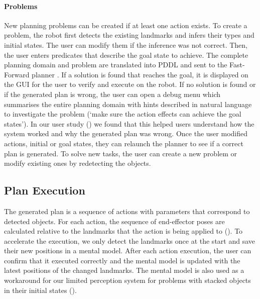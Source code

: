 \paragraph{Problems} New planning problems can be created if at least one action exists.
To create a problem, the robot first detects the existing landmarks and infers their types and initial states.
The user can modify them if the inference was not correct.
Then, the user enters predicates that describe the goal state to achieve.
The complete planning domain and problem are translated into PDDL and sent to the Fast-Forward planner \cite{hoffmann2001ff}.
If a solution is found that reaches the goal, it is displayed on the GUI for the user to verify and execute on the robot.
If no solution is found or if the generated plan is wrong, the user can open a debug menu which summarises the entire planning domain with hints described in natural language to investigate the problem (\eg `make sure the action effects can achieve the goal states').
In our user study () we found that this helped users understand how the system worked and why the generated plan was wrong.
Once the user modified actions, initial or goal states, they can relaunch the planner to see if a correct plan is generated.
To solve new tasks, the user can create a new problem or modify existing ones by redetecting the objects.

\subsection{Plan Execution} 
The generated plan is a sequence of actions with parameters that correspond to detected objects.
For each action, the sequence of end-effector poses are calculated relative to the landmarks that the action is being applied to ().
To accelerate the execution, we only detect the landmarks once at the start and save their new positions in a mental model.
After each action execution, the user can confirm that it executed correctly and the mental model is updated with the latest positions of the changed landmarks.
The mental model is also used as a workaround for our limited perception system for problems with stacked objects in their initial states ().


